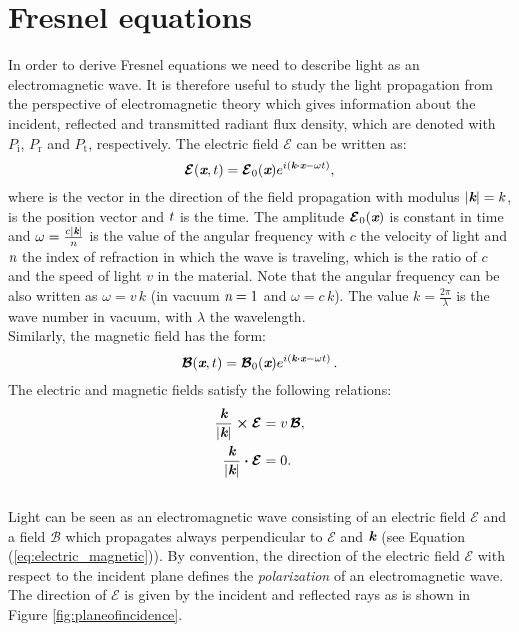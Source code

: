 \section{Fresnel equations}\label{sec:fresnel}
In order to derive Fresnel equations we need to describe light as an electromagnetic wave. 
It is therefore useful to study the light propagation from the perspective of electromagnetic theory which gives information about the incident, reflected and transmitted radiant flux density, which are denoted with $P_\textrm{i}$, $P_\textrm{r}$ and $P_\textrm{t}$, respectively.  
The electric field $\boldsymbol{\mathcal{E}}$ can be written as: 
\begin{equation}
\boldsymbol{\mathcal{E}}(\textit{\textbf{x}}, t) = \boldsymbol{\mathcal{E}}_0(\textit{\textbf{x}} )e^{i( \textit{\textbf{k}}\boldsymbol{\cdot}\textit{\textbf{x}}-\omega t)},
\end{equation}
where  is the vector in the direction of the field propagation with modulus 
$|\textit{\textbf{k}}| = k$,  is the position vector and $t$ is the time. The amplitude $\boldsymbol{\mathcal{E}}_0(\textit{\textbf{x}})$ is constant in time and $\omega = \frac{c |\textit{\textbf{k}}|}{n}$ is the value of the angular frequency with $c$ the velocity of light and $\textit{n}$ the index of refraction in which the wave is traveling, which is the ratio of $c$ and the speed of light $v$ in the material. Note that the angular frequency can be also written as $\omega = v\,k$ (in vacuum $\textit{n}=1$ and $\omega=c\,k$). The value
$k = \frac{2\pi}{\lambda}$ is the wave number in vacuum, with $\lambda$ the wavelength. \\ \indent Similarly, the magnetic field has the form:
\begin{equation}
\boldsymbol{\mathcal{B}}(\textit{\textbf{x}}, t) = \boldsymbol{\mathcal{B}}_0(\textit{\textbf{x}}) e^{i( \textit{\textbf{k}}\boldsymbol{\cdot} \textit{\textbf{x}}-\omega t )}\,.
\end{equation}
The electric and magnetic fields satisfy the following relations:
\begin{subequations}
\begin{align}
\frac{\textit{\textbf{k}}}{|\textit{\textbf{k}}|} \boldsymbol{\times} \boldsymbol{\mathcal{E}} & = v \, \boldsymbol{\mathcal{B}}, \label{eq:electric_magnetic}\\
\frac{\textit{\textbf{k}}}{|\textit{\textbf{k}}|} \boldsymbol{\cdot}\boldsymbol{\mathcal{E}} &=0.
\end{align}
\end{subequations}
\\ \indent Light can be seen as an electromagnetic wave consisting of an electric field $\boldsymbol{\mathcal{E}}$ and a field $\boldsymbol{\mathcal{B}}$ which propagates always perpendicular to $\boldsymbol{\mathcal{E}}$ and $\textit{\textbf{k}}$ (see Equation (\ref{eq:electric_magnetic})). By convention, the direction of the electric field $\boldsymbol{\mathcal{E}}$ \cite{feynman1964feynman} with respect to the incident plane defines the \textit{polarization} of an electromagnetic wave. The direction of $\boldsymbol{\mathcal{E}}$ is given by the incident and reflected rays as is shown in Figure \ref{fig:planeofincidence}. \\
